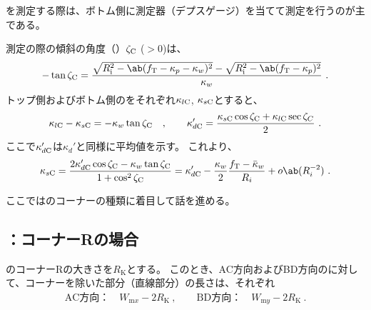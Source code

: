 \clearpage
\modHeadsection{\CsideKeywayDepth}
\CsideKeywayDepth を測定する際は、ボトム側に測定器（デプスゲージ）を当てて測定を行うのが主である。

測定の際の傾斜の角度（\KeywayDepthMeasurementAngle）$\zeta_\textrm C$ ($> 0$)は、
\begin{align}
  -\tan\zeta_\textrm C
  = \frac{\sqrt{R_\mathrm i^2-\ab(f_\mathrm T-\kappa_p-\kappa_w)^2}
          -\sqrt{R_\mathrm i^2-\ab(f_\mathrm T-\kappa_p)^2}}
         {\kappa_w}\ .
\end{align}
トップ側およびボトム側の\CsideKeywayDepth をそれぞれ$\kappa_{l\textrm C}$, $\kappa_{s\textrm C}$とすると、
\begin{align*}
  \kappa_{l\textrm C}-\kappa_{s\textrm C} = -\kappa_w\tan\zeta_\textrm C \quad, \qquad
  \kappa_{d\textrm C}' = \frac{\kappa_{s\textrm C}\cos\zeta_\textrm C+\kappa_{l\textrm C}\sec\zeta_C}2\ .
\end{align*}
ここで$\kappa_{d\textrm C}'$は$\kappa_d'$と同様に平均値を示す。
これより、
\begin{align*}
  \kappa_{s\textrm C}
  = \frac{2\kappa_{d\textrm C}'\cos\zeta_\textrm C-\kappa_w\tan\zeta_\textrm C}{1+\cos^2\zeta_\textrm C}
  = \kappa_{d\textrm C}'-\frac{\kappa_w}2\frac{f_\textrm T-\bar\kappa_w}{R_i}
    +o\ab(R_i^{-2})\ .
\end{align*}



\clearpage
ここでは\Keyway のコーナーの種類に着目して話を進める。


\subsection{\Keyway：コーナーRの場合}
\Keyway のコーナーRの大きさを$R_\mathrm K$とする。
このとき、AC方向およびBD方向の\KeywayWidth に対して、コーナーを除いた部分（直線部分）の長さは、それぞれ
\begin{align*}
  \text{AC方向：}\quad W_{\mathrm mx}-2R_\mathrm K~, \qquad
  \text{BD方向：}\quad W_{\mathrm my}-2R_\mathrm K\ .
\end{align*}


